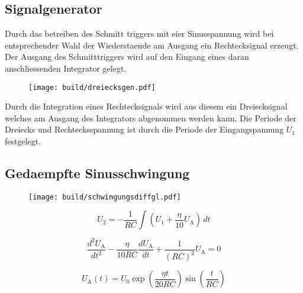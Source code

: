 \subsection{Signalgenerator}%
\label{sub:signalgenerator}
Durch das betreiben des Schmitt triggers mit eier Sinusspannung wird bei
entsprechender Wahl der Wiederstaende am Ausgang ein Rechtecksignal erzeugt.
Der Ausgang des Schmitttriggers wird auf den Eingang eines daran anschliessenden
Integrator gelegt. 
\begin{figure}[h]
		\centering
		\texttt{[image: build/dreiecksgen.pdf]}
		\caption{}
		\label{fig:}
\end{figure}
Durch die Integration eines Rechtecksignals wird aus diesem ein Dreiecksignal
welches am Ausgang des Integrators abgenommen werden kann.
Die Periode der Dreiecks und Rechtecksspannung ist durch die Periode der
Eingangspannung $U_1$ festgelegt.

\subsection{Gedaempfte Sinusschwingung}%
\label{sub:gedaempfte_sinusschwingung}

\begin{figure}[h]
		\centering
		\texttt{[image: build/schwingungsdiffgl.pdf]}
		\caption{}
		\label{fig:}
\end{figure}

\begin{equation}
		\label{eq:ov2}
		U_2 = - \frac{1}{RC} \int \left( U_1 + \frac{\eta}{10} U_\text{A} \right) \, dt
\end{equation}

\begin{equation}
		\label{eq:schwingung_diff}
		\frac{d^2 U_\text{A}}{dt^2} - \frac{\eta}{10 R C} \frac{d
		U_\text{A}}{dt} + \frac{1}{(RC)^2} U_\text{A} = 0
\end{equation}


\begin{equation}
		U_\text{A}(t) = U_0 \exp \left( \frac{\eta t}{20 RC} \right) 
		\sin \left(\frac{t}{RC}\right)
\end{equation}
